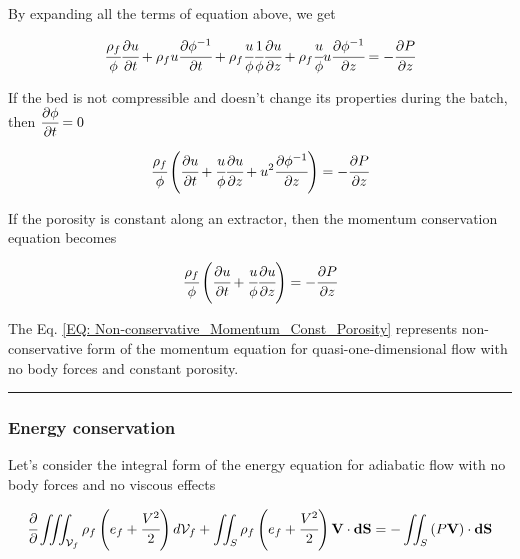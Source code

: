 \documentclass[../Article_Model_Parameters.tex]{subfiles}
\begin{document}
	By expanding all the terms of equation above, we get
	
	{\footnotesize
		\begin{equation}
			\cfrac{\rho_f}{\phi} \cfrac{\partial u}{\partial t} + \rho_f u \cfrac{\partial \phi^{-1}}{\partial t} + \rho_f \cfrac{u}{\phi} \cfrac{1}{\phi} \cfrac{\partial u}{\partial z} + \rho_f \cfrac{u}{\phi} u \cfrac{\partial \phi^{-1} }{\partial z} = - \cfrac{\partial P}{\partial z}
		\end{equation}
	}
	
	If the bed is not compressible and doesn't change its properties during the batch, then ${\footnotesize\cfrac{\partial \phi}{\partial t}=0}$
	
	{\footnotesize
		\begin{equation}
			\cfrac{\rho_f}{\phi} \left( \cfrac{\partial u}{\partial t} + \cfrac{u}{\phi} \cfrac{\partial u}{\partial z} + u^2 \cfrac{\partial \phi^{-1}}{\partial z} \right) = -\cfrac{\partial P}{\partial z}
		\end{equation}
	}

	If the porosity is constant along an extractor, then the momentum conservation equation becomes
	
	{\footnotesize
		\begin{equation}
			\cfrac{\rho_f}{\phi} \left( \cfrac{\partial u}{\partial t} + \cfrac{u}{\phi} \cfrac{\partial u}{\partial z} \right) = -\cfrac{\partial P}{\partial z}
			\label{EQ: Non-conservative_Momentum_Const_Porosity}
		\end{equation}
	}

	The Eq. \ref{EQ: Non-conservative_Momentum_Const_Porosity} represents non-conservative form of the momentum equation for quasi-one-dimensional flow with no body forces and constant porosity.
	
	\hrule
	
	\subsubsection{Energy conservation}
	
	Let's consider the integral form of the energy equation for adiabatic flow with no body forces and no viscous effects
	
	{\footnotesize
		\begin{equation}
			\cfrac{\partial}{\partial} \iiint_{\mathcal{V}_f} \rho_f \left( e_f + \cfrac{V^2}{2} \right) d\mathcal{V}_f + \iint_S \rho_f \left( e_f + \cfrac{V^2}{2} \right) \textbf{V} \cdot \textbf{dS} = - \iint_S \left( P\textbf{V} \right) \cdot \textbf{dS}
			\label{EQ: Energy_equation_integral}
		\end{equation}
	}
\end{document}
